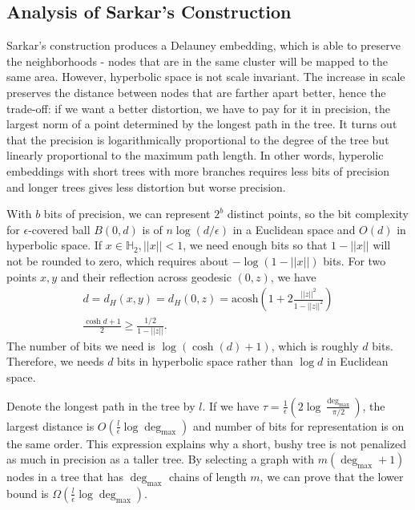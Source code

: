 \subsection{Analysis of Sarkar's Construction}

Sarkar's construction produces a Delauney embedding, which is able to preserve the neighborhoods - nodes that are in the same cluster will be mapped to the same area. However, hyperbolic space is not scale invariant. The increase in scale preserves the distance between nodes that are farther apart better, hence the trade-off: if we want a better distortion, we have to pay for it in precision, the largest norm of a point determined by the longest path in the tree. It turns out that the precision is logarithmically proportional to the degree of the tree but linearly proportional to the maximum path length. In other words, hyperolic embeddings with short trees with more branches requires less bits of precision and longer trees gives less distortion but worse precision.  

With $b$ bits of precision, we can represent $2^b$ distinct points, so the bit complexity for $\epsilon$-covered ball $B(0, d)$ is of $n\log(d/\epsilon)$ in a Euclidean space and $O(d)$ in hyperbolic space. If $x \in \mathbb{H}_2, ||x|| < 1$, we need enough bits so that $1 - ||x||$ will not be rounded to zero, which requires about $ -\log(1 - ||x||)$ bits. For two points $x, y$ and their reflection across geodesic $(0, z)$, we have 
\begin{align*}
    d = d_H(x, y) = d_H(0, z) = \text{acosh}(1 + 2 \frac{||z||^2}{1 - ||z||^2})\\
    \frac{\cosh{d}+1}{2} \geq \frac{1/2}{1 - ||z||}.
\end{align*}
The number of bits we need is $\log(\cosh(d)+1)$, which is roughly $d$ bits. Therefore, we needs $d$ bits in hyperbolic space rather than $\log d$ in Euclidean space. 

Denote the longest path in the tree by $l$. If we have $\tau = \frac{1}{\epsilon}(2 \log \frac{\deg_{\max}}{\pi/2})$, the largest distance is $O(\frac{l}{\epsilon} \log \deg_{\max})$ and number of bits for representation is on the same order. This expression explains why a short, bushy tree is not penalized as much in precision as a taller tree. By selecting a graph with $m(\deg_{\max} + 1)$ nodes in a tree that has $\deg_{\max}$ chains of length $m$, we can prove that the lower bound is $\Omega(\frac{l}{\epsilon} \log \deg_{\max})$.

